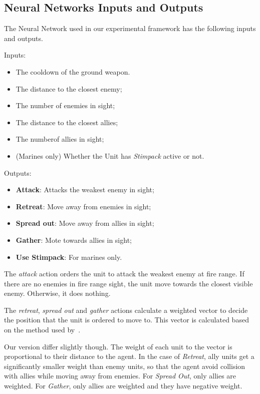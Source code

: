 \subsection{Neural Networks Inputs and Outputs}

The Neural Network used in our experimental framework has the
following inputs and outputs.

Inputs:
\begin{itemize}
    \item The cooldown of the ground weapon.
    \item The distance to the closest enemy;
    \item The number of enemies in sight;
    \item The distance to the closest allies;
    \item The numberof allies in sight;
    \item (Marines only) Whether the Unit has \emph{Stimpack} active or not.
\end{itemize}

Outputs:
\begin{itemize}
    \item {\bf Attack}: Attacks the weakest enemy in sight;
    \item {\bf Retreat}: Move away from enemies in sight;
    \item {\bf Spread out}: Move away from allies in sight;
    \item {\bf Gather}: Mote towards allies in sight;
    \item {\bf Use Stimpack}: For marines only.
\end{itemize}

The \emph{attack} action orders the unit to attack the weakest enemy
at fire range. If there are no enemies in fire range sight, the
unit move towards the closest visible enemy. Otherwise, it does nothing.

The \emph{retreat}, \emph{spread out} and \emph{gather} actions
calculate a weighted vector to decide the position that the unit is
ordered to move to. This vector is calculated based on the method used
by~\cite{Shantia11ConnectionistSC, Wender12ReinforcementMicroSC,
  Zhen13NeuroEvoSC}.

Our version differ slightly though. The weight of each unit to the
vector is proportional to their distance to the agent. In the case of
\emph{Retreat}, ally units get a significantly smaller weight than
enemy units, so that the agent avoid collision with allies while
moving away from enemies. For \emph{Spread Out}, only allies are
weighted. For \emph{Gather}, only allies are weighted and they have
negative weight.

